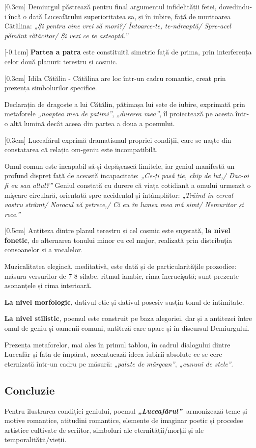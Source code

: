 \documentclass[
12pt,                        %
a4paper                      %
]{article}
\newcommand{\operatitle}{\textbf{\textit{„Luceafărul”\ }}} %
\begin{document}
[0.3cm]
Demiurgul păstrează pentru final argumentul infidelității fetei, dovedindu-i încă o dată Luceafărului superioritatea sa, și în iubire, față de muritoarea Cătălina: \textit{„Și pentru cine vrei să mori?/ Întoarce-te, te-ndreaptă/ Spre-acel pământ rătăcitor/ Și vezi ce te așteaptă.”}

[-0.1cm]
\textbf{Partea a patra} este constituită simetric față de prima, prin interferența celor două planuri: terestru și cosmic.

[0.3cm]
Idila Cătălin - Cătălina are loc într-un cadru romantic, creat prin prezența simbolurilor specifice.

Declarația de dragoste a lui Cătălin, pătimașa lui sete de iubire, exprimată prin metaforele \textit{„noaptea mea de patimi”}, \textit{„durerea mea”}, îl proiectează pe acesta într-o altă lumină decât aceea din partea a doua a poemului.

[0.3cm]
Luceafărul exprimă dramatismul propriei condiții, care se naște din constatarea că relația om-geniu este incompatibilă.

Omul comun este incapabil să-și depășească limitele, iar geniul manifestă un profund dispreț față de această incapacitate: \textit{„Ce-ți pasă ție, chip de lut,/ Dac-oi fi eu sau altul?”} Geniul constată cu durere că viața cotidiană a omului urmează o mișcare circulară, orientată spre accidental și întâmplător: \textit{„Trăind în cercul vostru strâmt/ Norocul vă petrece,/ Ci eu în lumea mea mă simt/ Nemuritor și rece.”}

[0.5cm]
Antiteza dintre planul terestru și cel cosmic este sugerată, \textbf{la nivel fonetic}, de alternarea tonului minor cu cel major, realizată prin distribuția consoanelor și a vocalelor.

Muzicalitatea elegiacă, meditativă, este dată și de particularitățile prozodice: măsura versurilor de 7-8 silabe, ritmul iambic, rima încrucișată; sunt prezente asonanțele și rima interioară.

\textbf{La nivel morfologic}, dativul etic și dativul posesiv susțin tonul de intimitate.

\textbf{La nivel stilistic}, poemul este construit pe baza alegoriei, dar și a antitezei între omul de geniu și oamenii comuni, antiteză care apare și în discursul Demiurgului.

Prezența metaforelor, mai ales în primul tablou, în cadrul dialogului dintre Luceafăr și fata de împărat, accentuează ideea iubirii absolute ce se cere eternizată într-un cadru pe măsură: \textit{„palate de mărgean”}, \textit{„cununi de stele”}.

\subsection{Concluzie}

Pentru ilustrarea condiției geniului, poemul \operatitle armonizează teme și motive romantice, atitudini romantice, elemente de imaginar poetic și procedee artistice cultivate de scriitor, simboluri ale eternității/morții și ale temporalității/vieții.
\end{document}
